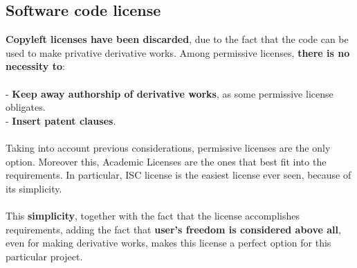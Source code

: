 \documentclass[11pt]{article}
\begin{document}
\subsection{Software code license}
\textbf{Copyleft licenses have been discarded}, due to the fact that the code can be used to make privative derivative works.
Among permissive licenses, \textbf{there is no necessity to}:\\
\\
- \textbf{Keep away authorship of derivative works}, as some permissive license obligates.\\
- \textbf{Insert patent clauses}.\\
\\
Taking into account previous considerations, permissive licenses are the only option. Moreover this, Academic Licenses are the ones that best fit into the requirements. In particular, ISC license is the easiest license ever seen, because of its simplicity. \\
\\
This \textbf{simplicity}, together with the fact that the license accomplishes requirements, adding the fact that \textbf{user's\textbf{} freedom is considered above all}, even for making derivative works, makes this license a perfect option for this particular project.
\end{document}
